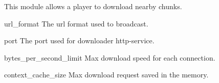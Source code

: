 
This module allows a player to download nearby chunks.

\begin{Configuration}
    \item[url\_format]{
        The url format used to broadcast.
    }

    \item[port] {
        The port used for downloader http-service.
    }

    \item[bytes\_per\_second\_limit]{
        Max download speed for each connection.
    }

    \item[context\_cache\_size]{
        Max download request saved in the memory.
    }
\end{Configuration}


